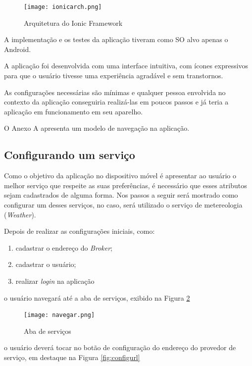 \begin{figure}[!htb]
  \centering
  \texttt{[image: ionicarch.png]} %
  \caption[Arquitetura do Ionic Framework]{Arquitetura do Ionic Framework}
  \label{fig:ionicarch}
\end{figure}

A implementação e os testes da aplicação tiveram como SO alvo apenas o Android.

A aplicação foi desenvolvida com uma interface intuitiva, com ícones expressivos para que o usuário tivesse uma experiência agradável e sem transtornos.

As configurações necessárias são mínimas e qualquer pessoa envolvida no contexto da aplicação conseguiria realizá-las em poucos passos e já teria a aplicação em funcionamento em seu aparelho.

O Anexo A apresenta um modelo de navegação na aplicação.

\subsection{Configurando um serviço}
Como o objetivo da aplicação no dispositivo móvel é apresentar ao usuário o melhor serviço que respeite as suas preferências, é necessário que esses atributos sejam cadastrados de alguma forma. Nos passos a seguir será mostrado como configurar um desses serviços, no caso, será utilizado o serviço de metereologia (\textit{Weather}).

Depois de realizar as configurações iniciais, como:
\begin{footnotesize}
  \begin{enumerate}
    \item cadastrar o endereço do \textit{Broker};
    \item cadastrar o usuário;
    \item realizar \textit{login} na aplicação
  \end{enumerate}
\end{footnotesize}

o usuário navegará até a aba de serviços, exibido na Figura \ref{fig:navegar}

\begin{figure}[!htb]
  \centering
  \texttt{[image: navegar.png]} %
  \caption[Aba de serviços]{Aba de serviços}
  \label{fig:navegar}
\end{figure}

o usuário deverá tocar no botão de configuração do endereço do provedor de serviço, em destaque na Figura \ref{fig:configurl}

